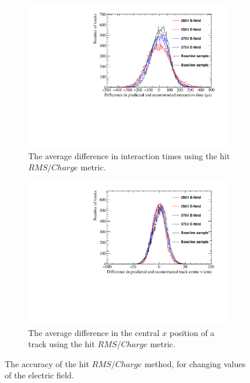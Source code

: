 \begin{figure}[h!]
  \centering
  \begin{subfigure}{0.6\textwidth}
    \centering
    \includegraphics[width=\textwidth]{Canvas_AvDiff_T_RMS_Q_ElecField}
    \caption{The average difference in interaction times using the hit $RMS/Charge$ metric.}
    \label{fig:DiffElecStudy_AvDiff_RMS_Int_T}
  \end{subfigure}
  \begin{subfigure}{0.6\textwidth}
    \centering
    \includegraphics[width=\textwidth]{Canvas_AvDiff_X_RMS_Q_ElecField}
    \caption{The average difference in the central $x$ position of a track using the hit $RMS/Charge$ metric.}
    \label{fig:DiffElecStudy_AvDiff_RMS_Int_X}
  \end{subfigure}
  \caption[Comparing the accuracy of the hit $RMS$ method, as the electric field changes]
          {The accuracy of the hit $RMS/Charge$ method, for changing values of the electric field. }
  \label{fig:DiffElecStudy_AvDiff_RMS_Int}
\end{figure}

